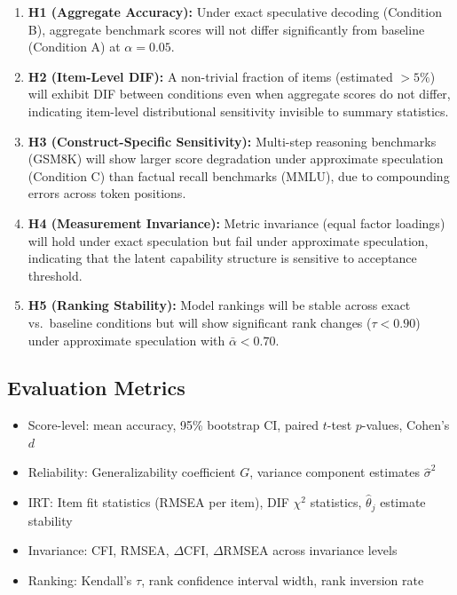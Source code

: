 \documentclass{article}
\begin{document}
\begin{enumerate}[leftmargin=1.5em]
    \item \textbf{H1 (Aggregate Accuracy):} Under exact speculative decoding (Condition B), aggregate benchmark scores will not differ significantly from baseline (Condition A) at $\alpha = 0.05$.
    \item \textbf{H2 (Item-Level DIF):} A non-trivial fraction of items (estimated $> 5\%$) will exhibit DIF between conditions even when aggregate scores do not differ, indicating item-level distributional sensitivity invisible to summary statistics.
    \item \textbf{H3 (Construct-Specific Sensitivity):} Multi-step reasoning benchmarks (GSM8K) will show larger score degradation under approximate speculation (Condition C) than factual recall benchmarks (MMLU), due to compounding errors across token positions.
    \item \textbf{H4 (Measurement Invariance):} Metric invariance (equal factor loadings) will hold under exact speculation but fail under approximate speculation, indicating that the latent capability structure is sensitive to acceptance threshold.
    \item \textbf{H5 (Ranking Stability):} Model rankings will be stable across exact vs.\ baseline conditions but will show significant rank changes ($\tau < 0.90$) under approximate speculation with $\bar{\alpha} < 0.70$.
\end{enumerate}

\subsection{Evaluation Metrics}

\begin{itemize}[leftmargin=1.5em]
    \item Score-level: mean accuracy, 95\% bootstrap CI, paired $t$-test $p$-values, Cohen's $d$
    \item Reliability: Generalizability coefficient $G$, variance component estimates $\hat{\sigma}^2$
    \item IRT: Item fit statistics (RMSEA per item), DIF $\chi^2$ statistics, $\hat{\theta}_j$ estimate stability
    \item Invariance: CFI, RMSEA, $\Delta$CFI, $\Delta$RMSEA across invariance levels
    \item Ranking: Kendall's $\tau$, rank confidence interval width, rank inversion rate
\end{itemize}
\end{document}
